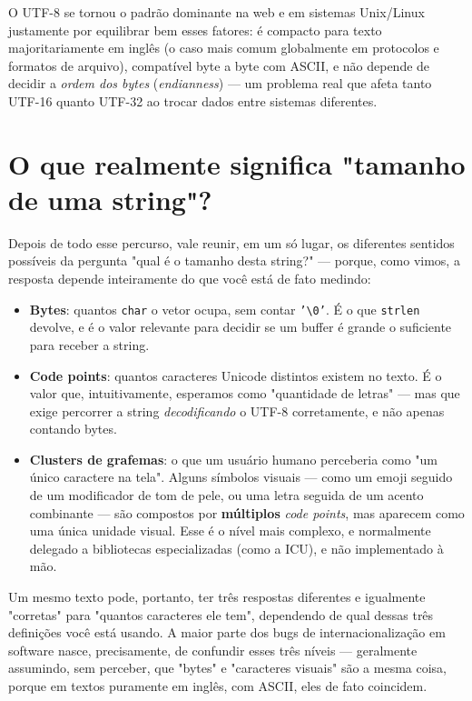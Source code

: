 O UTF-8 se tornou o padrão dominante na web e em sistemas Unix/Linux justamente por equilibrar bem esses fatores: é compacto para texto majoritariamente em inglês (o caso mais comum globalmente em protocolos e formatos de arquivo), compatível byte a byte com ASCII, e não depende de decidir a \textit{ordem dos bytes} (\textit{endianness}) — um problema real que afeta tanto UTF-16 quanto UTF-32 ao trocar dados entre sistemas diferentes.

\section*{O que realmente significa "tamanho de uma string"?}

Depois de todo esse percurso, vale reunir, em um só lugar, os diferentes sentidos possíveis da pergunta "qual é o tamanho desta string?" — porque, como vimos, a resposta depende inteiramente do que você está de fato medindo:

\begin{itemize}
    \item \textbf{Bytes}: quantos \texttt{char} o vetor ocupa, sem contar \texttt{'\textbackslash 0'}. É o que \texttt{strlen} devolve, e é o valor relevante para decidir se um buffer é grande o suficiente para receber a string.
    \item \textbf{Code points}: quantos caracteres Unicode distintos existem no texto. É o valor que, intuitivamente, esperamos como "quantidade de letras" — mas que exige percorrer a string \textit{decodificando} o UTF-8 corretamente, e não apenas contando bytes.
    \item \textbf{Clusters de grafemas}: o que um usuário humano perceberia como "um único caractere na tela". Alguns símbolos visuais — como um emoji seguido de um modificador de tom de pele, ou uma letra seguida de um acento combinante — são compostos por \textbf{múltiplos} \textit{code points}, mas aparecem como uma única unidade visual. Esse é o nível mais complexo, e normalmente delegado a bibliotecas especializadas (como a ICU), e não implementado à mão.
\end{itemize}

Um mesmo texto pode, portanto, ter três respostas diferentes e igualmente "corretas" para "quantos caracteres ele tem", dependendo de qual dessas três definições você está usando. A maior parte dos bugs de internacionalização em software nasce, precisamente, de confundir esses três níveis — geralmente assumindo, sem perceber, que "bytes" e "caracteres visuais" são a mesma coisa, porque em textos puramente em inglês, com ASCII, eles de fato coincidem.


